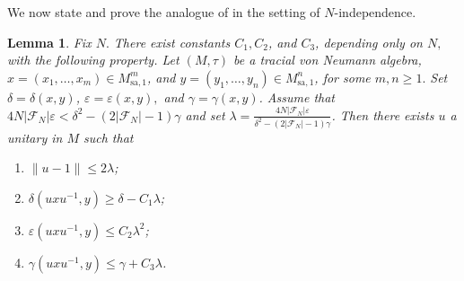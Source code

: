 \documentclass[10pt]{amsart}
\numberwithin{equation}{section}
\newtheorem{lem}[thm]{Lemma}
\theoremstyle{definition}
\newcommand{\cF}{\mathcal{F}}
\newcommand{\ee}{\varepsilon}
\begin{document}
We now state and prove the analogue of \cite[Lemma~5.4]{houdayer2023asymptotic} in the setting of $N$-independence.

\begin{lem}\label{lem-main-technical}
    Fix $N.$ There exist constants $C_1,C_2$, and $C_3$, depending only on $N,$ with the following property. Let $(M,\tau)$ be a tracial von Neumann algebra, $x = (x_1,\ldots,x_m)\in M_{\mathrm{sa},1}^m$, and $y = (y_1,\ldots,y_n)\in M_{\mathrm{sa},1}^n$, for some $m,n\ge1.$ Set $\delta = \delta(x,y)$, $\ee= \ee(x,y),$ and $\gamma = \gamma(x,y)$. Assume that $4N|\cF_N|\ee < \delta^2 - (2|\cF_N|-1)\gamma$ and set $\lambda = \frac{4N|\cF_N|\ee}{\delta^2 - (2|\cF_N|-1)\gamma}$. Then there exists $u$ a unitary in $M$ such that 
    \begin{enumerate}
        \item $\|u-1\| \le 2\lambda$;
        \item $\delta(uxu^{-1},y) \ge \delta - C_1\lambda$;
        \item $\ee(uxu^{-1},y)\le C_2\lambda^2$;
        \item $\gamma(uxu^{-1},y) \le \gamma + C_3\lambda$.
    \end{enumerate}
\end{lem} 
\end{document}
